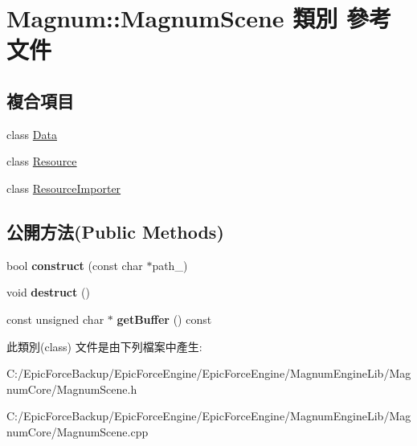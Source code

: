 \hypertarget{class_magnum_1_1_magnum_scene}{}\section{Magnum\+:\+:Magnum\+Scene 類別 參考文件}
\label{class_magnum_1_1_magnum_scene}
\subsection*{複合項目}
\begin{DoxyCompactItemize}
\item 
class \hyperlink{class_magnum_1_1_magnum_scene_1_1_data}{Data}
\item 
class \hyperlink{class_magnum_1_1_magnum_scene_1_1_resource}{Resource}
\item 
class \hyperlink{class_magnum_1_1_magnum_scene_1_1_resource_importer}{Resource\+Importer}
\end{DoxyCompactItemize}
\subsection*{公開方法(Public Methods)}
\begin{DoxyCompactItemize}
\item 
bool {\bfseries construct} (const char $\ast$path\+\_\+)\hypertarget{class_magnum_1_1_magnum_scene_a35290c3f1433ccf50fc0ffaf10ddcd99}{}\label{class_magnum_1_1_magnum_scene_a35290c3f1433ccf50fc0ffaf10ddcd99}

\item 
void {\bfseries destruct} ()\hypertarget{class_magnum_1_1_magnum_scene_abed4830a2c7c95410d0588a0b24cf989}{}\label{class_magnum_1_1_magnum_scene_abed4830a2c7c95410d0588a0b24cf989}

\item 
const unsigned char $\ast$ {\bfseries get\+Buffer} () const \hypertarget{class_magnum_1_1_magnum_scene_add732b4394927f7108e54515e1edc524}{}\label{class_magnum_1_1_magnum_scene_add732b4394927f7108e54515e1edc524}

\end{DoxyCompactItemize}


此類別(class) 文件是由下列檔案中產生\+:\begin{DoxyCompactItemize}
\item 
C\+:/\+Epic\+Force\+Backup/\+Epic\+Force\+Engine/\+Epic\+Force\+Engine/\+Magnum\+Engine\+Lib/\+Magnum\+Core/Magnum\+Scene.\+h\item 
C\+:/\+Epic\+Force\+Backup/\+Epic\+Force\+Engine/\+Epic\+Force\+Engine/\+Magnum\+Engine\+Lib/\+Magnum\+Core/Magnum\+Scene.\+cpp\end{DoxyCompactItemize}
